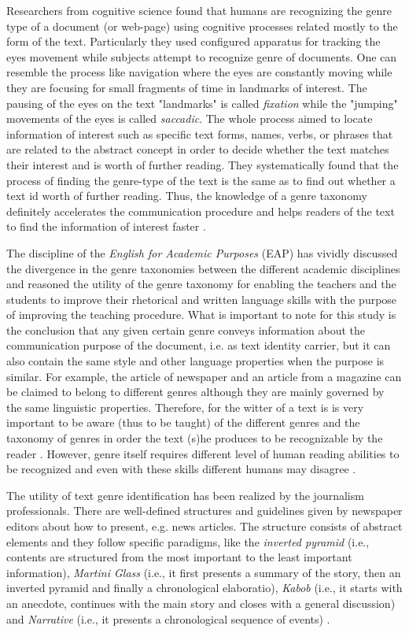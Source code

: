 Researchers from cognitive science found that humans are recognizing the genre type of a document (or web-page) using cognitive processes related mostly to the form of the text. Particularly they used configured apparatus for tracking the eyes movement while subjects attempt to recognize genre of documents. One can resemble the process like navigation where the eyes are constantly moving while they are focusing for small fragments of time in landmarks of interest. The pausing of the eyes on the text "landmarks" is called \textit{fixation} while the "jumping" movements of the eyes is called \textit{saccadic}. The whole process aimed to locate information of interest such as specific text forms, names, verbs, or phrases that are related to the abstract concept in order to decide whether the text matches their interest and is worth of further reading. They systematically found that the process of finding the genre-type of the text is the same as to find out whether a text id worth of further reading. Thus, the knowledge of a genre taxonomy definitely accelerates the communication procedure and helps readers of the text to find the information of interest faster \parencite{clark2014you}.

The discipline of the \textit{English for Academic Purposes} (EAP) has vividly discussed the divergence in the genre taxonomies between the different academic disciplines and reasoned the utility of the genre taxonomy for enabling the teachers and the students to improve their rhetorical and written language skills with the purpose of improving the teaching procedure. What is important to note for this study is the conclusion that any given certain genre conveys information about the communication purpose of the document, i.e. as text identity carrier, but it can also contain the same style and other language properties when the purpose is similar. For example, the article of newspaper and an article from a magazine can be claimed to belong to different genres although they are mainly governed by the same linguistic properties. Therefore, for the witter of a text is is very important to be aware (thus to be taught) of the different genres and the taxonomy of genres in order the text (s)he produces to be recognizable by the reader \parencite{hardy2016genre,melissourgou2017genre,al2017genre}. However, genre itself requires different level of human reading abilities to be recognized and even with these skills different humans may disagree \parencite{mccarthy2009psychological}.

The utility of text genre identification has been realized by the journalism professionals. There are well-defined structures and guidelines given by newspaper editors about how to present, e.g. news articles. The structure consists of abstract elements and they follow specific paradigms, like the \textit{inverted pyramid} (i.e., contents are structured from the most important to the least important information), \textit{Martini Glass} (i.e., it first presents a summary of the story, then an inverted pyramid and finally a chronological elaboratio), \textit{Kabob} (i.e., it starts with an anecdote, continues with the main story and closes with a general discussion) and \textit{Narrative} (i.e., it presents a chronological sequence of events) \parencite{dai2018fine}.

